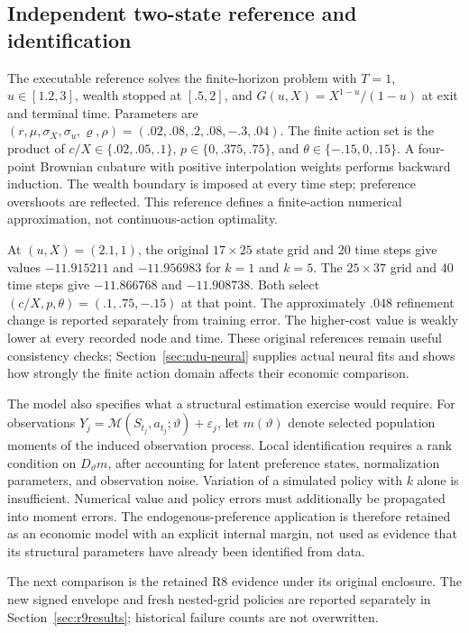 \documentclass[ecta,draft]{econsocart}
\theoremstyle{definition}
\theoremstyle{remark}
\begin{document}
\subsection{Independent two-state reference and identification}
The executable reference solves the finite-horizon problem with $T=1$, $u\in[1.2,3]$, wealth stopped at $[.5,2]$, and $G(u,X)=X^{1-u}/(1-u)$ at exit and terminal time. Parameters are $(r,\mu,\sigma_X,\sigma_u,\varrho,\rho)=(.02,.08,.2,.08,-.3,.04)$. The finite action set is the product of $c/X\in\{.02,.05,.1\}$, $p\in\{0,.375,.75\}$, and $\theta\in\{-.15,0,.15\}$. A four-point Brownian cubature with positive interpolation weights performs backward induction. The wealth boundary is imposed at every time step; preference overshoots are reflected. This reference defines a finite-action numerical approximation, not continuous-action optimality.

At $(u,X)=(2.1,1)$, the original $17\times25$ state grid and 20 time steps give values $-11.915211$ and $-11.956983$ for $k=1$ and $k=5$. The $25\times37$ grid and 40 time steps give $-11.866768$ and $-11.908738$. Both select $(c/X,p,\theta)=(.1,.75,-.15)$ at that point. The approximately $.048$ refinement change is reported separately from training error. The higher-cost value is weakly lower at every recorded node and time. These original references remain useful consistency checks; Section~\ref{sec:ndu-neural} supplies actual neural fits and shows how strongly the finite action domain affects their economic comparison.

The model also specifies what a structural estimation exercise would require. For observations $Y_j=\mathcal M(S_{t_j},a_{t_j};\vartheta)+\varepsilon_j$, let $m(\vartheta)$ denote selected population moments of the induced observation process. Local identification requires a rank condition on $D_\vartheta m$, after accounting for latent preference states, normalization parameters, and observation noise. Variation of a simulated policy with $k$ alone is insufficient. Numerical value and policy errors must additionally be propagated into moment errors. The endogenous-preference application is therefore retained as an economic model with an explicit internal margin, not used as evidence that its structural parameters have already been identified from data.

The next comparison is the retained R8 evidence under its original enclosure. The new signed envelope and fresh nested-grid policies are reported separately in Section~\ref{sec:r9results}; historical failure counts are not overwritten.

\end{document}
